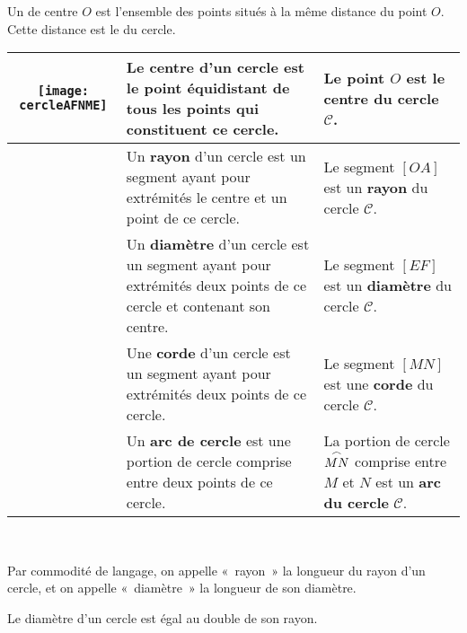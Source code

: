 \begin{methode*1}

\begin{definition}
Un \textbf{} de centre $O$ est l'ensemble des points situés à la même distance du point $O$. 
Cette distance est le \textbf{} du cercle.
\end{definition}

\begin{tabular}{|c|p{5cm}|p{3cm}|}
\hline
 \multirow{5}{*}{\texttt{[image: cercleAFNME]}} & Le \textcolor{C2}{\textbf{centre}} d'un cercle est le point équidistant de tous les points qui constituent ce cercle. & Le point $O$ est le \textcolor{C2}{\textbf{centre}} du cercle $\mathcal{C}$.\\ \hline
 & Un \textcolor{J1}{\textbf{rayon}} d'un cercle est un segment ayant pour extrémités le centre et un point de ce cercle. & Le segment $[OA]$ est un  \textcolor{J1}{\textbf{rayon}} du cercle $\mathcal{C}$.\\ \hline
 & Un  \textcolor{H1}{\textbf{diamètre}} d'un cercle est un segment ayant pour extrémités deux points de ce cercle et contenant son centre. & Le segment $[EF]$ est un  \textcolor{H1}{\textbf{diamètre}} du cercle $\mathcal{C}$.\\ \hline
 & Une  \textcolor{PartieFonction}{\textbf{corde}} d'un cercle est un segment ayant pour extrémités deux points de ce cercle. & Le segment $[MN]$ est une  \textcolor{PartieFonction}{\textbf{corde}} du cercle $\mathcal{C}$.\\ \hline
 & Un  \textcolor{B2}{\textbf{arc de cercle}} est une portion de cercle comprise entre deux points de ce cercle. & La portion de cercle $\overset{\huge{\frown}}{MN}$ comprise entre $M$ et $N$ est un  \textcolor{B2}{\textbf{arc du cercle}} $\mathcal{C}$.\\ \hline
  \end{tabular} \\
  
 \begin{remarque}
 Par commodité de langage, on appelle « rayon » la longueur du rayon d'un cercle, et  on appelle « diamètre » la longueur de son diamètre.
  \end{remarque}
  
 \begin{remarque}
 Le diamètre d'un cercle est égal au double de son rayon.
  \end{remarque}


\end{methode*1}
